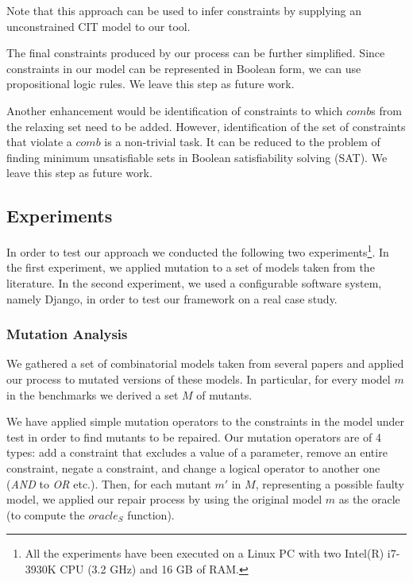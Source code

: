 \begin{tikzborder}{\cite{Gargantini16:validation}}
\begin{tikzborder}{\cite{gargantini_combinatorial_2017}}
\begin{tikzborder}{\cite{gargantini_combinatorial_2017}}
Note that this approach can be used to infer constraints by supplying an unconstrained CIT model to our tool. 

The final constraints produced by our process can be further simplified. Since constraints in our model can be represented in Boolean form, we can use propositional logic rules. We leave this step as future work. 

Another enhancement would be identification of constraints to which $comb$s from the relaxing set need to be added. However, identification of the set of constraints that violate a $comb$ is a non-trivial task. It can be reduced to the problem of finding minimum unsatisfiable sets in Boolean satisfiability solving (SAT). We leave this step as future work.\be

\subsection{Experiments}\label{sec:constr_experiments}

\bb In order to test our approach we conducted the following two experiments\footnote{All the experiments have been executed on a Linux PC with two Intel(R) i7-3930K CPU  (3.2 GHz) and 16 GB of RAM.}. In the first experiment, we applied mutation to a set of models taken from the literature. In the second experiment, we used a configurable software system, namely Django, in order to test our framework on a real case study.\be


\subsubsection{Mutation Analysis}

\bb
We gathered a set of combinatorial models taken from several papers and applied our process to mutated versions of these models. In particular, for every model $m$ in the benchmarks we derived a set $M$ of mutants.

We have applied simple mutation operators to the constraints in the model under test in order to find  mutants to be repaired. Our mutation operators are of 4 types: add a constraint that excludes a value of a parameter, remove an entire constraint, negate a constraint, and change a logical operator to another one (\emph{AND} to \emph{OR} etc.).   Then, for each mutant $m'$ in $M$, representing a possible faulty model,  we applied our repair process by using the original model $m$ as the oracle (to compute the $\mathit{oracle}_S$ function). 


\end{tikzborder}
\end{tikzborder}
\end{tikzborder}

